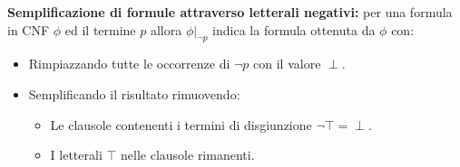 \documentclass[../main.tex]{subfiles}
\begin{document}
    \textbf{Semplificazione di formule attraverso letterali negativi:} per una formula in CNF $\phi$ ed il termine $p$ allora $\phi |_{\lnot p}$ indica la formula ottenuta da $\phi$ con:
    \begin{itemize}
        \item Rimpiazzando tutte le occorrenze di $\lnot p$ con il valore $\perp$.
        \item Semplificando il risultato rimuovendo:
        \begin{itemize}
            \item Le clausole contenenti i termini di disgiunzione $\lnot \top = \perp$.
            \item I letterali $\top$ nelle clausole rimanenti.
        \end{itemize}
    \end{itemize}
\end{document}
